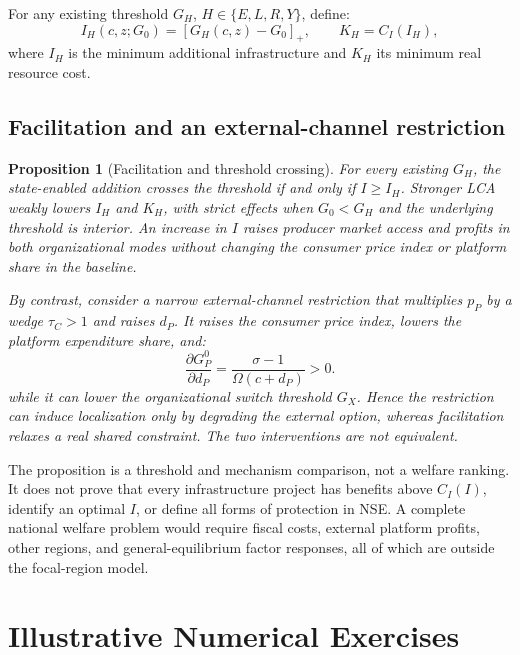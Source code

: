 \documentclass[11pt]{article}
\newtheorem{proposition}{Proposition}
\theoremstyle{definition}
\theoremstyle{remark}
\begin{document}
For any existing threshold \(G_H\), \(H\in\{E,L,R,Y\}\), define:
\begin{equation}
 I_H(c,z;G_0)
 =
 [G_H(c,z)-G_0]_+,
 \qquad
 K_H=C_I(I_H),
 \label{eq:facilitating_thresholds}
\end{equation}
where \(I_H\) is the minimum additional infrastructure and \(K_H\) its minimum
real resource cost.

\subsection{Facilitation and an external-channel restriction}

\begin{proposition}[Facilitation and threshold crossing]
\label{prop:state}
For every existing \(G_H\), the state-enabled addition crosses the threshold
if and only if \(I\geq I_H\).  Stronger LCA weakly lowers \(I_H\) and \(K_H\),
with strict effects when \(G_0<G_H\) and the underlying threshold is interior.
An increase in \(I\) raises producer market access and profits in both
organizational modes without changing the consumer price index or platform
share in the baseline.

By contrast, consider a narrow external-channel restriction that multiplies
\(p_P\) by a wedge \(\tau_C>1\) and raises \(d_P\).  It raises the consumer
price index, lowers the platform expenditure share, and:
\begin{equation}
 \frac{\partial G_P^0}{\partial d_P}
 =
 \frac{\sigma-1}{\Omega(c+d_P)}>0.
 \label{eq:restriction_entry}
\end{equation}
while it can lower the organizational switch threshold \(G_X\).  Hence the
restriction can induce localization only by degrading the external option,
whereas facilitation relaxes a real shared constraint.  The two interventions
are not equivalent.
\end{proposition}

The proposition is a threshold and mechanism comparison, not a welfare
ranking.  It does not prove that every infrastructure project has benefits
above \(C_I(I)\), identify an optimal \(I\), or define all forms of protection
in NSE.  A complete national welfare problem would require fiscal costs,
external platform profits, other regions, and general-equilibrium factor
responses, all of which are outside the focal-region model.

\section{Illustrative Numerical Exercises}
\end{document}
